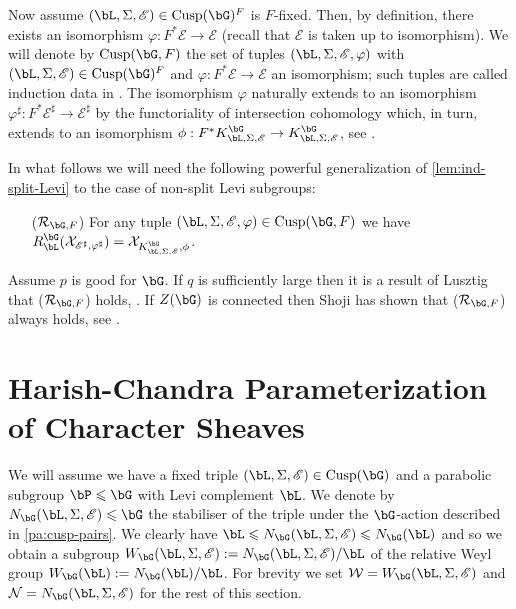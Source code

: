 \documentclass[eqthmnum,nocolour,skinny]{jt-calcs}
\DeclareMathOperator{\Cusp}{Cusp}
\begin{document}
\begin{pa}
Now assume $(\bL,\Sigma,\mathscr{E}) \in \Cusp(\bG)^F$ is $F$-fixed. Then, by definition, there exists an isomorphism $\varphi : F^*\mathscr{E} \to \mathscr{E}$ (recall that $\mathscr{E}$ is taken up to isomorphism). We will denote by $\Cusp(\bG,F)$ the set of tuples $(\bL,\Sigma,\mathscr{E},\varphi)$ with $(\bL,\Sigma,\mathscr{E}) \in \Cusp(\bG)^F$ and $\varphi : F^*\mathscr{E} \to \mathscr{E}$ an isomorphism; such tuples are called induction data in \cite[1.8]{lusztig:1990:green-functions-and-character-sheaves}. The isomorphism $\varphi$ naturally extends to an isomorphism $\varphi^{\sharp} : F^*\mathscr{E}^{\sharp} \to \mathscr{E}^{\sharp}$ by the functoriality of intersection cohomology which, in turn, extends to an isomorphism $\phi : F^*K_{\bL,\Sigma,\mathscr{E}}^{\bG} \to K_{\bL,\Sigma,\mathscr{E}}^{\bG}$, see \cite[8.2]{lusztig:1985:character-sheaves}.
\end{pa}

\begin{pa}\label{pa:property-DL-ind}
In what follows we will need the following powerful generalization of \cref{lem:ind-split-Levi} to the case of non-split Levi subgroups:
\begin{enumerate}[leftmargin=1.5cm]
	\item[($\mathcal{R}_{\bG,F}$)] For any tuple $(\bL,\Sigma,\mathscr{E},\varphi) \in \Cusp(\bG,F)$ we have $R_{\bL}^{\bG}(\mathcal{X}_{\mathscr{E}^{\sharp},\varphi^{\sharp}}) = \mathcal{X}_{K_{\bL,\Sigma,\mathscr{E}}^{\bG},\phi}$.
\end{enumerate}
Assume $p$ is good for $\bG$. If $q$ is sufficiently large then it is a result of Lusztig that ($\mathcal{R}_{\bG,F}$) holds, \cite[Prop.~9.2]{lusztig:1990:green-functions-and-character-sheaves}. If $Z(\bG)$ is connected then Shoji has shown that ($\mathcal{R}_{\bG,F}$) always holds, see \cite[Thm.~4.2]{shoji:1996:on-the-computation}.
\end{pa}


\section{Harish-Chandra Parameterization of Character Sheaves}\label{sec:harish-chandra-param-char-sheaves}

\begin{pa}
We will assume we have a fixed triple $(\bL,\Sigma,\mathscr{E}) \in \Cusp(\bG)$ and a parabolic subgroup $\bP\leqslant\bG$ with Levi complement $\bL$. We denote by $N_{\bG}(\bL,\Sigma,\mathscr{E}) \leqslant \bG$ the stabiliser of the triple under the $\bG$-action described in \cref{pa:cusp-pairs}. We clearly have $\bL \leqslant N_{\bG}(\bL,\Sigma,\mathscr{E}) \leqslant N_{\bG}(\bL)$ and so we obtain a subgroup $W_{\bG}(\bL,\Sigma,\mathscr{E}) := N_{\bG}(\bL,\Sigma,\mathscr{E})/\bL$ of the relative Weyl group $W_{\bG}(\bL) := N_{\bG}(\bL)/\bL$. For brevity we set $\mathcal{W} = W_{\bG}(\bL,\Sigma,\mathscr{E})$ and $\mathcal{N} = N_{\bG}(\bL,\Sigma,\mathscr{E})$ for the rest of this section.
\end{pa}
\end{document}
